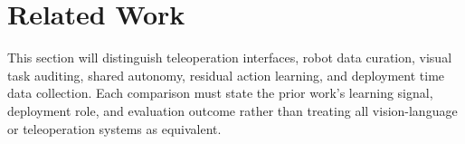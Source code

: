 \section{Related Work}
\label{sec:related_work}

This section will distinguish teleoperation interfaces, robot data curation,
visual task auditing, shared autonomy, residual action learning, and deployment
time data collection. Each comparison must state the prior work's learning
signal, deployment role, and evaluation outcome rather than treating all
vision-language or teleoperation systems as equivalent.
